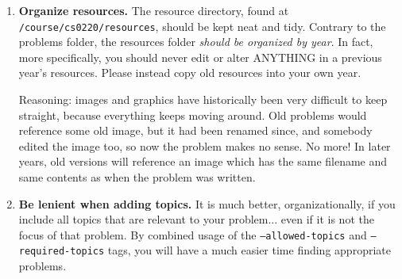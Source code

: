 {\begin{enumerate}
      Take advantage of \textit{private} assignments, which allow you to mark
      an assignment as a midterm/exam which did not have solutions released.
      The problems within it can be reused soon afterwards, and the finalize
      tool will mark the problems as used privately (allowing the build tool
      to not filted it out).
    \item \textbf{Organize resources.} The resource directory, found at
      \texttt{/course/cs0220/resources}, should be kept neat and tidy.
      Contrary to the problems folder, the resources folder \textit{should
      be organized by year}. In fact, more specifically, you should never
      edit or alter ANYTHING in a previous year's resources. Please instead
      copy old resources into your own year.
      
      Reasoning: images and graphics have historically been very difficult to
      keep straight, because everything keeps moving around. Old problems
      would reference some old image, but it had been renamed since, and 
      somebody edited the image too, so now the problem makes no sense. No
      more! In later years, old versions will reference an image which
      has the same filename and same contents as when the problem was
      written.
    \item \textbf{Be lenient when adding topics.} It is much better,
      organizationally, if you include all topics that are relevant to your
      problem... even if it is not the focus of that problem. By combined
      usage of the \texttt{--allowed-topics} and \texttt{--required-topics}
      tags, you will have a much easier time finding appropriate problems.
      

\end{enumerate}}
